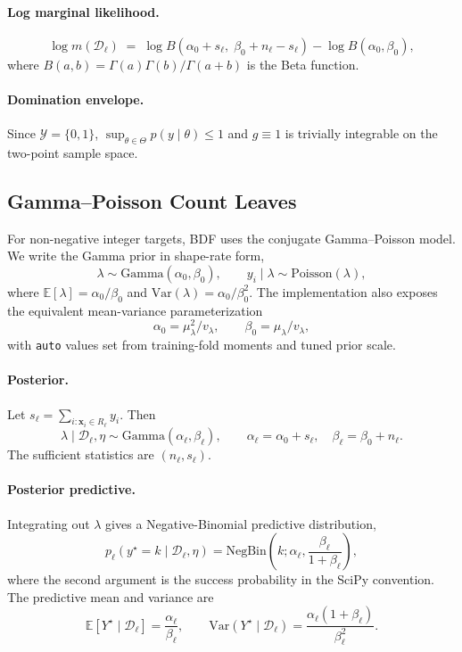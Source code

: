 \documentclass[10pt]{article} %
\begin{document}
\paragraph{Log marginal likelihood.}
\begin{equation}\label{eq:beta_log_marginal}
\log m(\mathcal{D}_\ell)
\;=\; \log B\!\left(\alpha_0 + s_\ell,\; \beta_0 + n_\ell - s_\ell\right) - \log B(\alpha_0, \beta_0),
\end{equation}
where $B(a,b) = \Gamma(a)\Gamma(b)/\Gamma(a+b)$ is the Beta function.

\paragraph{Domination envelope.} Since $\mathcal{Y}=\{0,1\}$, $\sup_{\theta\in\Theta}p(y\mid\theta)\le 1$ and $g\equiv 1$ is trivially integrable on the two-point sample space.

\subsection{Gamma--Poisson Count Leaves}\label{app:conjugate_poisson}

For non-negative integer targets, BDF uses the conjugate Gamma--Poisson model. We write the Gamma prior in shape-rate form,
\[
\lambda \sim \mathrm{Gamma}(\alpha_0,\beta_0),
\qquad
y_i\mid \lambda \sim \mathrm{Poisson}(\lambda),
\]
where $\mathbb{E}[\lambda]=\alpha_0/\beta_0$ and $\mathrm{Var}(\lambda)=\alpha_0/\beta_0^2$. The implementation also exposes the equivalent mean-variance parameterization
\[
\alpha_0=\mu_\lambda^2/v_\lambda,
\qquad
\beta_0=\mu_\lambda/v_\lambda,
\]
with \texttt{auto} values set from training-fold moments and tuned prior scale.

\paragraph{Posterior.}
Let $s_\ell=\sum_{i:\mathbf{x}_i\in R_\ell} y_i$. Then
\begin{equation}\label{eq:poisson_posterior}
\lambda\mid\mathcal{D}_\ell,\eta
\sim
\mathrm{Gamma}(\alpha_\ell,\beta_\ell),
\qquad
\alpha_\ell=\alpha_0+s_\ell,
\quad
\beta_\ell=\beta_0+n_\ell .
\end{equation}
The sufficient statistics are $(n_\ell,s_\ell)$.

\paragraph{Posterior predictive.}
Integrating out $\lambda$ gives a Negative-Binomial predictive distribution,
\begin{equation}\label{eq:poisson_predictive}
p_\ell(y^\star=k\mid\mathcal{D}_\ell,\eta)
=
\mathrm{NegBin}\!\left(k;\alpha_\ell,\frac{\beta_\ell}{1+\beta_\ell}\right),
\end{equation}
where the second argument is the success probability in the SciPy convention. The predictive mean and variance are
\[
\mathbb{E}[Y^\star\mid\mathcal{D}_\ell]=\frac{\alpha_\ell}{\beta_\ell},
\qquad
\mathrm{Var}(Y^\star\mid\mathcal{D}_\ell)=
\frac{\alpha_\ell(1+\beta_\ell)}{\beta_\ell^2}.
\]
\end{document}
